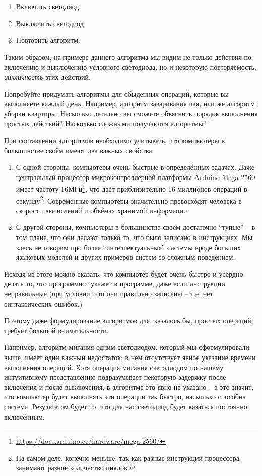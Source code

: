 \documentclass[../sparc.tex]{subfiles}
\begin{document}
\begin{enumerate}
\item Включить светодиод.
\item Выключить светодиод
\item Повторить алгоритм.
\end{enumerate}

Таким образом, на примере данного алгоритма мы видим не только действия по
включению и выключению условного светодиода, но и некоторую повторяемость,
\emph{цикличность} этих действий.

 { Попробуйте придумать алгоритмы для обыденных операций, которые
  вы выполняете каждый день.  Например, алгоритм заваривания чая, или же
  алгоритм уборки квартиры.  Насколько детально вы сможете объяснить порядок
  выполнения простых действий?  Насколько сложными получаются алгоритмы?}

При составлении алгоритмов необходимо учитывать, что компьютеры в большинстве
своём имеют два важных свойства:
\begin{enumerate}
\item С одной стороны, компьютеры очень быстрые в определённых задачах.  Даже
  центральный процессор микроконтроллерной платформы Arduino Mega 2560 имеет
  частоту 16МГц\footnote{\url{https://docs.arduino.cc/hardware/mega-2560/}}, что
  даёт приблизительно 16 миллионов операций в секунду\footnote{На самом деле,
  конечно меньше, так как разные инструкции процессора занимают разное
  количество циклов.}.  Современные компьютеры значительно превосходят человека
  в скорости вычислений и объёмах хранимой информации.
\item С другой стороны, компьютеры в большинстве своём достаточно ``тупые'' -- в
  том плане, что они делают только то, что было записано в инструкциях.  Мы
  здесь не говорим про более ``интеллектуальные'' системы вроде больших языковых
  моделей и других примеров систем со сложным поведением.
\end{enumerate}

Исходя из этого можно сказать, что компьютер будет очень быстро и усердно делать
то, что программист укажет в программе, даже если инструкции неправильные (при
условии, что они правильно записаны -- т.е. нет синтаксических ошибок.)

Поэтому даже формулирование алгоритмов для, казалось бы, простых операций,
требует большой внимательности.

Например, алгоритм мигания одним светодиодом, который мы сформулировали выше,
имеет один важный недостаток: в нём отсутствует явное указание времени
выполнения операций.  Хотя операция мигания светодиодом по нашему интуитивному
представлению подразумевает некоторую задержку после включения и после
выключения, в алгоритме это явно не указано -- а это значит, что компьютер будет
выполнять эти операции так быстро, насколько способна система.  Результатом
будет то, что для нас светодиод будет казаться постоянно включённым.
\end{document}
